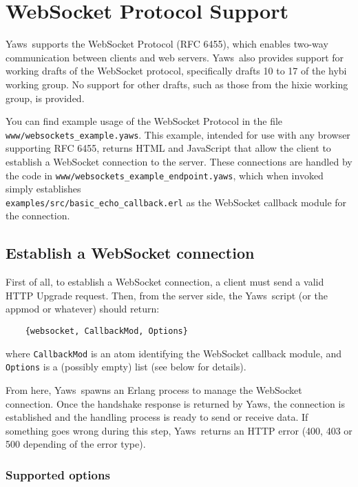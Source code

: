 \documentclass[11pt,oneside,english]{book}
\newcommand{\Yaws}            %
        {{\sc Yaws}}
\begin{document}
\chapter{WebSocket Protocol Support}
\label{websockets}

\Yaws\ supports the WebSocket Protocol (RFC 6455), which enables two-way
communication between clients and web servers. \Yaws\ also provides support for
working drafts of the WebSocket protocol, specifically drafts 10 to 17 of the
hybi working group. No support for other drafts, such as those from the hixie
working group, is provided.

You can find example usage of the WebSocket Protocol in the file
\verb+www/websockets_example.yaws+. This example, intended for use with any
browser supporting RFC 6455, returns HTML and JavaScript that allow the client
to establish a WebSocket connection to the server. These connections are handled
by the code in \verb+www/websockets_example_endpoint.yaws+, which when invoked
simply establishes \\ \verb+examples/src/basic_echo_callback.erl+ as the
WebSocket callback module for the connection.


\section{Establish a WebSocket connection}

First of all, to establish a WebSocket connection, a client must send a valid
HTTP Upgrade request. Then, from the server side, the \Yaws{}ript (or the appmod
or whatever) should return:

\begin{verbatim}
    {websocket, CallbackMod, Options}
\end{verbatim}

where \verb+CallbackMod+ is an atom identifying the WebSocket callback module,
and \verb+Options+ is a (possibly empty) list (see below for details).


From here, \Yaws\ spawns an Erlang process to manage the WebSocket
connection. Once the handshake response is returned by \Yaws, the connection is
established and the handling process is ready to send or receive data. If
something goes wrong during this step, \Yaws\ returns an HTTP error (400, 403 or
500 depending of the error type).

\subsection{Supported options}
\end{document}
